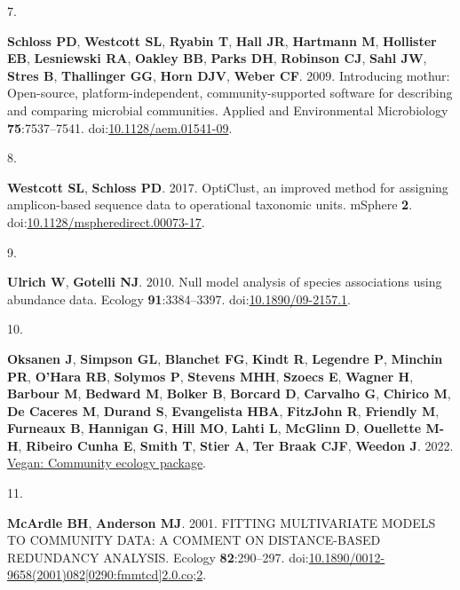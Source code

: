 \documentclass[
]{article}
\newlength{\cslhangindent}
\newlength{\csllabelwidth}
\newlength{\cslentryspacingunit} %
\newenvironment{CSLReferences}[2] %
 {%
  \setlength{\parindent}{0pt}
  \ifodd #1
  \let\oldpar\par
  \def\par{\hangindent=\cslhangindent\oldpar}
  \fi
  \setlength{\parskip}{#2\cslentryspacingunit}
 }%
 {}
\newcommand{\CSLLeftMargin}[1]{\parbox[t]{\csllabelwidth}{#1}}
\newcommand{\CSLRightInline}[1]{\parbox[t]{\linewidth - \csllabelwidth}{#1}\break}
\begin{document}
\begin{CSLReferences}{0}{1}
\leavevmode{}%
\CSLLeftMargin{7. }%
\CSLRightInline{\textbf{Schloss PD}, \textbf{Westcott SL},
\textbf{Ryabin T}, \textbf{Hall JR}, \textbf{Hartmann M},
\textbf{Hollister EB}, \textbf{Lesniewski RA}, \textbf{Oakley BB},
\textbf{Parks DH}, \textbf{Robinson CJ}, \textbf{Sahl JW}, \textbf{Stres
B}, \textbf{Thallinger GG}, \textbf{Horn DJV}, \textbf{Weber CF}. 2009.
Introducing mothur: Open-source, platform-independent,
community-supported software for describing and comparing microbial
communities. Applied and Environmental Microbiology
\textbf{75}:7537--7541.
doi:\href{https://doi.org/10.1128/aem.01541-09}{10.1128/aem.01541-09}.}

\leavevmode{}%
\CSLLeftMargin{8. }%
\CSLRightInline{\textbf{Westcott SL}, \textbf{Schloss PD}. 2017.
{OptiClust}, an improved method for assigning amplicon-based sequence
data to operational taxonomic units. {mSphere} \textbf{2}.
doi:\href{https://doi.org/10.1128/mspheredirect.00073-17}{10.1128/mspheredirect.00073-17}.}

\leavevmode{}%
\CSLLeftMargin{9. }%
\CSLRightInline{\textbf{Ulrich W}, \textbf{Gotelli NJ}. 2010. Null model
analysis of species associations using abundance data. Ecology
\textbf{91}:3384--3397.
doi:\href{https://doi.org/10.1890/09-2157.1}{10.1890/09-2157.1}.}

\leavevmode{}%
\CSLLeftMargin{10. }%
\CSLRightInline{\textbf{Oksanen J}, \textbf{Simpson GL},
\textbf{Blanchet FG}, \textbf{Kindt R}, \textbf{Legendre P},
\textbf{Minchin PR}, \textbf{O'Hara RB}, \textbf{Solymos P},
\textbf{Stevens MHH}, \textbf{Szoecs E}, \textbf{Wagner H},
\textbf{Barbour M}, \textbf{Bedward M}, \textbf{Bolker B},
\textbf{Borcard D}, \textbf{Carvalho G}, \textbf{Chirico M}, \textbf{De
Caceres M}, \textbf{Durand S}, \textbf{Evangelista HBA},
\textbf{FitzJohn R}, \textbf{Friendly M}, \textbf{Furneaux B},
\textbf{Hannigan G}, \textbf{Hill MO}, \textbf{Lahti L}, \textbf{McGlinn
D}, \textbf{Ouellette M-H}, \textbf{Ribeiro Cunha E}, \textbf{Smith T},
\textbf{Stier A}, \textbf{Ter Braak CJF}, \textbf{Weedon J}. 2022.
\href{https://CRAN.R-project.org/package=vegan}{Vegan: Community ecology
package}.}

\leavevmode{}%
\CSLLeftMargin{11. }%
\CSLRightInline{\textbf{McArdle BH}, \textbf{Anderson MJ}. 2001.
{FITTING} {MULTIVARIATE} {MODELS} {TO} {COMMUNITY} {DATA}: A {COMMENT}
{ON} {DISTANCE}-{BASED} {REDUNDANCY} {ANALYSIS}. Ecology
\textbf{82}:290--297.
doi:\href{https://doi.org/10.1890/0012-9658(2001)082\%5B0290:fmmtcd\%5D2.0.co;2}{10.1890/0012-9658(2001)082{[}0290:fmmtcd{]}2.0.co;2}.}


\end{CSLReferences}
\end{document}
